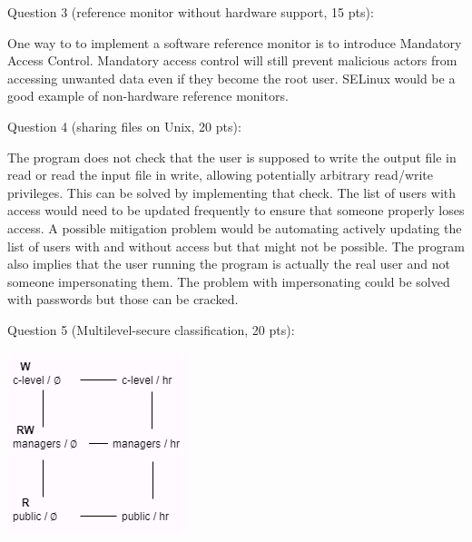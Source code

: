 \documentclass[11pt]{article}
\begin{document}
\newpage

Question 3 (reference monitor without hardware support, 15 pts):

One way to to implement a software reference monitor is to introduce Mandatory Access Control. Mandatory access control will still prevent malicious actors from accessing unwanted data even if they become the root user. SELinux would be a good example of non-hardware reference monitors. 

\newpage

Question 4 (sharing files on Unix, 20 pts):

The program does not check that the user is supposed to write the output file in read or read the input file in write, allowing potentially arbitrary read/write privileges. This can be solved by implementing that check.
The list of users with access would need to be updated frequently to ensure that someone properly loses access. A possible mitigation problem would be automating actively updating the list of users with and without access but that might not be possible.
The program also implies that the user running the program is actually the real user and not someone impersonating them. The problem with impersonating could be solved with passwords but those can be cracked.

\newpage

Question 5 (Multilevel-secure classification, 20 pts):

\includegraphics{lattice}
\end{document}
